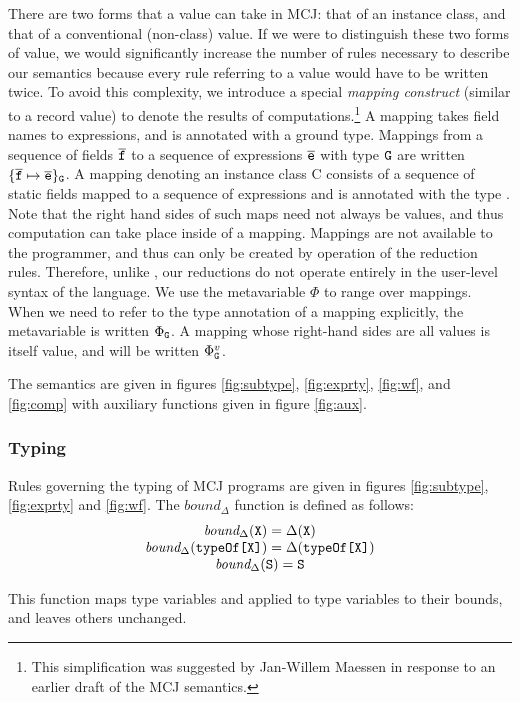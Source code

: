 \documentclass[nocopyrightspace,10pt]{acm-sigplan}
\begin{document}
There are two forms that a value can take in MCJ: that of an instance
class, and that of a conventional (non-class) value. If we were to
distinguish these two forms of value, we would significantly increase
the number of rules necessary to describe our semantics because every
rule referring to a value would have to be written twice. To avoid
this complexity, we introduce a special {\em mapping construct}
(similar to a record value) to denote the results of
computations.\footnote{This simplification was suggested by Jan-Willem
Maessen in response to an earlier draft of the MCJ semantics.}  A
mapping takes field names to expressions, and is annotated with a
ground type. Mappings from a sequence of fields ${\overline{{\mbox {\tt f}}}}$ to a sequence of
expressions ${\overline{{\mbox {\tt e}}}}$ with type $\mathtt{{G}}$ are written $\{{{\overline{{\mbox {\tt f}}}}} \mapsto {\ensuremath {{\overline{{\mbox {\tt e}}}}}}\}_{\mathtt{{G}}}$.
A mapping denoting an instance class {\txt C} consists of a sequence
of static fields mapped to a sequence of expressions and is annotated
with the type \typeof{\C}. Note that the right hand sides of such
maps need not always be values, and thus computation can take place
inside of a mapping.  Mappings are not available to the programmer,
and thus can only be created by operation of the reduction rules.
Therefore, unlike \FJ, our reductions do not operate entirely in the
user-level syntax of the language.  We use the metavariable $\Phi$ to
range over mappings.  When we need to refer to the type annotation of
a mapping explicitly, the metavariable is written $\Phi_{\mathtt{{G}}}$.  A
mapping whose right-hand sides are all values is itself value, and
will be written $\Phi_{\mathtt{{G}}}^v$.  

The semantics are given in figures \ref{fig:subtype},
\ref{fig:exprty}, \ref{fig:wf}, and \ref{fig:comp} with auxiliary
functions given in figure \ref{fig:aux}.


\subsubsection{Typing}
Rules governing the typing of MCJ programs are given in figures
\ref{fig:subtype}, \ref{fig:exprty} and \ref{fig:wf}.  The
$bound_{\Delta}$ function is defined as follows:
\begin{displaymath}
\begin{array}{c}
\mbox{\it bound}_{\Delta}(\mbox {\tt X}) = \Delta(\mbox {\tt X}) \\
\mbox{\it bound}_{\Delta}({\mathtt{{typeOf}}{\mbox{\tt [}}\mbox {\tt X}\mbox{{\tt ]}}}) = \Delta({\mathtt{{typeOf}}{\mbox{\tt [}}\mbox {\tt X}\mbox{{\tt ]}}}) \\
\mbox{\it bound}_{\Delta}(\mbox {\tt S}) = \mbox {\tt S}
\end{array}
\end{displaymath}

This function maps type variables and {} applied to type
variables to their bounds, and leaves others unchanged.
\end{document}
